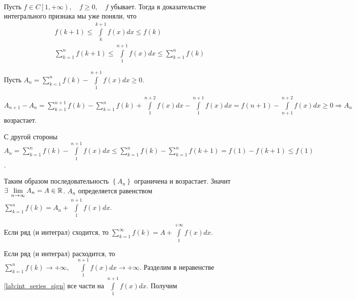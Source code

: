 \documentclass[../main.tex]{subfiles}
\begin{document}
\begin{example}
    
    ~

    Пусть \( f \in C\left[ 1, + \infty \right),\quad f \geq 0,\quad f\) убывает. Тогда в доказательстве интегрального признака мы уже поняли, что 
    \begin{equation}\label{lab:int_series_sign}
        \begin{aligned}
            & f\left( k+1\right) \leq \displaystyle\int\limits_{ k}^{ k+1} f\left( x\right)dx \leq f\left( k\right)\\ 
            & \sum\limits_{ k=1}^{ n} f\left( k+1\right) \leq \displaystyle\int\limits_{ 1}^{ n+1} f\left( x\right)dx \leq \sum\limits_{ k=1}^{ n} f\left( k\right)
        \end{aligned}
    \end{equation}

    Пусть \( A_n= \sum\limits_{ k=1}^{ n} f\left( k\right)- \displaystyle\int\limits_{ 1}^{ n+1} f\left( x\right)dx \geq 0\).

    \( A_{n+1}-A_n= \sum\limits_{ k=1}^{ n+1} f\left( k\right) - \sum\limits_{ k=1}^{ n} f\left( k\right) + \displaystyle\int\limits_{ 1}^{ n+2} f\left( x\right)dx- \displaystyle\int\limits_{ 1}^{ n + 1} f\left( x\right)dx=f\left( n+1\right) -\displaystyle\int\limits_{ n+1}^{ n+2} f\left( x\right)dx \geq 0 \Longrightarrow A_n\) возрастает. 

    С другой стороны \\\( A_n = \sum\limits_{ k=1}^{ n} f\left( k\right)- \displaystyle\int\limits_{ 1}^{ n+1} f\left( x\right)dx \leq \sum\limits_{ k=1}^{ n} f\left( k\right)- \sum\limits_{ k=1}^{ n} f\left( k+1\right)=f\left( 1\right)-f\left( k+1\right) \leq f\left( 1\right)\).

    Таким образом последовательность \( \left\{ A_n\right\}\) ограничена и возрастает. Значит \\\( \exists \; \lim\limits_{ n \rightarrow \infty } A_n=A \in \mathbb{R} \). \( A_n\) определяется равенством \( \sum\limits_{k=1}^{ n}f\left( k\right)=A_n+ \displaystyle\int\limits_{ 1}^{ n+1} f\left( x\right)dx\). 

    Если ряд (и интеграл) сходится, то \( \boxed{ \sum\limits_{ k=1}^{ \infty } f\left( k\right)=A+ \displaystyle\int\limits_{ 1}^{ + \infty } f\left( x\right)dx}\).

    Если ряд (и интеграл) расходится, то \( \sum\limits_{ k=1}^{ n} f\left( k\right) \longrightarrow + \infty ,\quad \displaystyle\int\limits_{ 1}^{ n+1} f\left( x\right)dx \longrightarrow + \infty \). Разделим в неравенстве \ref{lab:int_series_sign} все части на \( \displaystyle\int\limits_{ 1}^{ n + 1} f\left( x\right)dx\). Получим 
   

\end{example}
\end{document}
